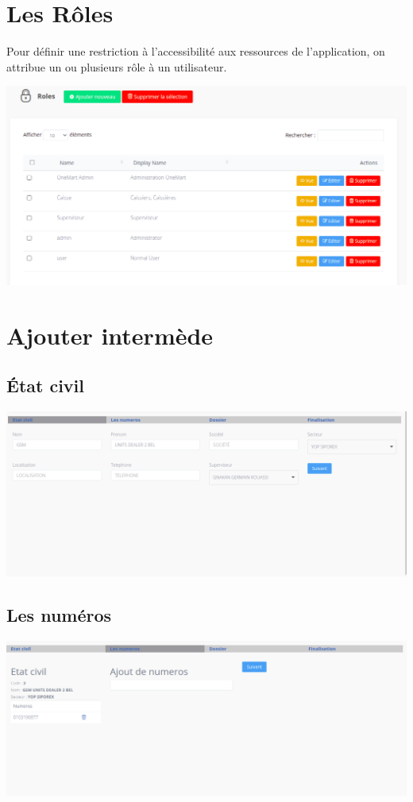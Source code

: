 	\section{Les Rôles}
		Pour définir une restriction à l'accessibilité aux ressources de l'application, on attribue un ou plusieurs rôle à un utilisateur.
		\begin{center}
			\includegraphics[scale=0.4]{chap_3/roles.png}
			\label{les_roles}
		\end{center}
	\section{Ajouter intermède}
		\subsection*{État civil}
		\begin{center}
			\includegraphics[scale=0.4]{chap_3/ajouter-intermed-etat-civil.png}
			\label{ajouter_intermede-etat-civil}
		\end{center}
		\subsection*{Les numéros}
			\begin{center}
				\includegraphics[scale=0.4]{chap_3/ajout-intermed-numeros.png}
				\label{ajouter_intermede-les-numeros}
			\end{center}
		
